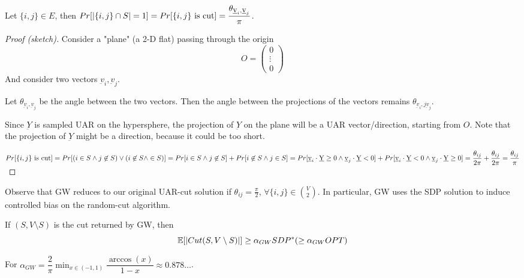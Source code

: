     \begin{lemma}\label{lemma:gw1}
        Let $\{i,j\} \in E$, then $Pr[\vert  \{i,j\} \cap S  \vert = 1] = Pr[\{i,j\} \text{ is cut}] = \dfrac{\theta_{\underbar{v}_i, \underbar{v}_j}}{\pi}$.
    \end{lemma}

    \begin{proof}[Proof (sketch)]
        Consider a "plane" (a 2-D flat) passing through the origin
        \[ O =  \begin{pmatrix}
            0\\ 
            \vdots\\
            0
          \end{pmatrix} \]
        And consider two vectors $\underbar{v}_i, \underbar{v}_j$.

        Let $\theta_{\underbar{v}_i,\underbar{v}_j}$ be the angle between the two vectors.
        Then the angle between the projections of the vectors remains $\theta_{\underbar{v}_i,j\underbar{v}_j}$.

        Since $\underbar{Y}$ is sampled UAR on the hypersphere, the projection of $\underbar{Y}$ on the plane will be a UAR vector/direction, starting from $O$.
        Note that the projection of $\underbar{Y}$ might be a direction, because it could be too short.

        $Pr[\{i,j\} \text{ is cut}] =
        Pr[(i \in S \wedge j \not\in S) \vee (i \not\in S \wedge \in S)] = 
        Pr[i \in S \wedge j \not\in S] + Pr[i \not\in S \wedge j \in S] =
        Pr[\underbar{v}_i \cdot \underbar{Y} \geq 0 \wedge \underbar{v}_j \cdot \underbar{Y} < 0] + Pr[\underbar{v}_i \cdot \underbar{Y} < 0 \wedge \underbar{v}_j \cdot \underbar{Y} \geq 0] =
        \dfrac{\theta_{ij}}{2 \pi} + \dfrac{\theta_{ij}}{2 \pi} =
        \dfrac{\theta_{ij}}{\pi}$
    \end{proof}

    Observe that GW reduces to our original UAR-cut solution if $\theta_{ij} = \frac{\pi}{2}$, $\forall \{i,j\} \in \binom{V}{2}$.
    In particular, GW uses the SDP solution to induce controlled bias on the random-cut algorithm.

    \begin{theorem}
        If $(S, V \setminus S)$ is the cut returned by GW, then
        \[ \mathbb{E}[\vert Cut(S, V \setminus S) \vert] \geq \alpha_{GW} SDP^* (\geq \alpha_{GW} OPT) \]

        For $\alpha_{GW} = \dfrac{2}{\pi} \min_{x \in (-1,1)} \dfrac{\arccos (x)}{1-x} \approx 0.878\dots$.
    \end{theorem}

